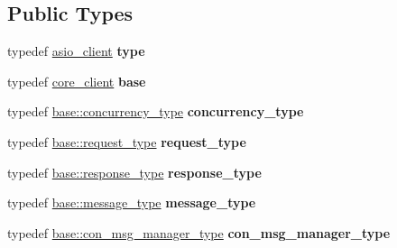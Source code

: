 \subsection*{Public Types}
\begin{DoxyCompactItemize}
\item 
typedef \hyperlink{structwebsocketpp_1_1config_1_1asio__client}{asio\+\_\+client} {\bfseries type}\hypertarget{structwebsocketpp_1_1config_1_1asio__client_a83c2101418dca5389a5d6a6af7351f36}{}\label{structwebsocketpp_1_1config_1_1asio__client_a83c2101418dca5389a5d6a6af7351f36}

\item 
typedef \hyperlink{structwebsocketpp_1_1config_1_1core__client}{core\+\_\+client} {\bfseries base}\hypertarget{structwebsocketpp_1_1config_1_1asio__client_adfbce2c3351334c0b83b8575cf48ac6f}{}\label{structwebsocketpp_1_1config_1_1asio__client_adfbce2c3351334c0b83b8575cf48ac6f}

\item 
typedef \hyperlink{classwebsocketpp_1_1concurrency_1_1basic}{base\+::concurrency\+\_\+type} {\bfseries concurrency\+\_\+type}\hypertarget{structwebsocketpp_1_1config_1_1asio__client_a0443785a3a6e6f8d0f924fad4206b9a8}{}\label{structwebsocketpp_1_1config_1_1asio__client_a0443785a3a6e6f8d0f924fad4206b9a8}

\item 
typedef \hyperlink{classwebsocketpp_1_1http_1_1parser_1_1request}{base\+::request\+\_\+type} {\bfseries request\+\_\+type}\hypertarget{structwebsocketpp_1_1config_1_1asio__client_ab199fcea968ae7873e81b07bc4cfe0b8}{}\label{structwebsocketpp_1_1config_1_1asio__client_ab199fcea968ae7873e81b07bc4cfe0b8}

\item 
typedef \hyperlink{classwebsocketpp_1_1http_1_1parser_1_1response}{base\+::response\+\_\+type} {\bfseries response\+\_\+type}\hypertarget{structwebsocketpp_1_1config_1_1asio__client_aa83f5f53ad2530fcf2af691a44ca74c0}{}\label{structwebsocketpp_1_1config_1_1asio__client_aa83f5f53ad2530fcf2af691a44ca74c0}

\item 
typedef \hyperlink{classwebsocketpp_1_1message__buffer_1_1message}{base\+::message\+\_\+type} {\bfseries message\+\_\+type}\hypertarget{structwebsocketpp_1_1config_1_1asio__client_a5148ca616b771b4a701f7a4d9b68cdbf}{}\label{structwebsocketpp_1_1config_1_1asio__client_a5148ca616b771b4a701f7a4d9b68cdbf}

\item 
typedef \hyperlink{classwebsocketpp_1_1message__buffer_1_1alloc_1_1con__msg__manager}{base\+::con\+\_\+msg\+\_\+manager\+\_\+type} {\bfseries con\+\_\+msg\+\_\+manager\+\_\+type}\hypertarget{structwebsocketpp_1_1config_1_1asio__client_a428558a45b8df29fd19677bd1f302434}{}\label{structwebsocketpp_1_1config_1_1asio__client_a428558a45b8df29fd19677bd1f302434}


\end{DoxyCompactItemize}
